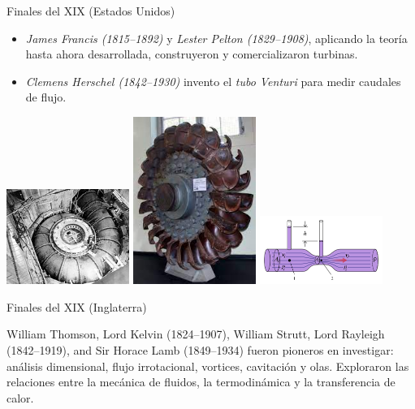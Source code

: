 \documentclass [xcolor=svgnames, t] {beamer}
\begin{document}
\begin{frame}{Finales del XIX (Estados Unidos)}
\vspace{-0.4cm}
\begin{exampleblock}{}
\begin{itemize}
\item \emph{James Francis (1815–1892)} y \emph{Lester Pelton (1829–1908)}, aplicando la teoría hasta ahora desarrollada, construyeron y comercializaron turbinas.
\item \emph{Clemens Herschel (1842–1930)} invento el \emph{tubo Venturi} para medir caudales de flujo.
\end{itemize}
\end{exampleblock}
\begin{center}
\includegraphics[width=0.3\textwidth]{franc}
\includegraphics[width=0.3\textwidth]{pelton}
\includegraphics[width=0.3\textwidth]{ventu}
\end{center}
\end{frame}

\begin{frame}{Finales del XIX (Inglaterra)}
\vspace{-0.4cm}
\begin{exampleblock}{}
William Thomson, Lord Kelvin (1824–1907), William Strutt, Lord Rayleigh (1842–1919), and Sir Horace Lamb (1849–1934) fueron pioneros en investigar: análisis dimensional, flujo irrotacional, vortices, cavitaci\'on y olas. Exploraron las relaciones entre la mecánica de fluidos, la termodinámica y la transferencia de calor.
\end{exampleblock}
\end{frame}
\end{document}
